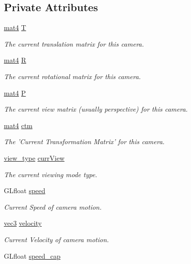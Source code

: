\subsection*{Private Attributes}
\begin{DoxyCompactItemize}
\item 
\hyperlink{class_angel_1_1mat4}{mat4} \hyperlink{class_camera_aa4cb92b539c9a9707a12d7025ed889f6}{T}
\begin{DoxyCompactList}\small\item\em The current translation matrix for this camera. \end{DoxyCompactList}\item 
\hyperlink{class_angel_1_1mat4}{mat4} \hyperlink{class_camera_a8fd028120b18556c43ad86756e637fbc}{R}
\begin{DoxyCompactList}\small\item\em The current rotational matrix for this camera. \end{DoxyCompactList}\item 
\hyperlink{class_angel_1_1mat4}{mat4} \hyperlink{class_camera_a0bee6fbae6ec5960850a5fb858f3912a}{P}
\begin{DoxyCompactList}\small\item\em The current view matrix (usually perspective) for this camera. \end{DoxyCompactList}\item 
\hyperlink{class_angel_1_1mat4}{mat4} \hyperlink{class_camera_a9b1e81e3f5531390bb6a599dca0d2444}{ctm}
\begin{DoxyCompactList}\small\item\em The 'Current Transformation Matrix' for this camera. \end{DoxyCompactList}\item 
\hyperlink{class_camera_afdccec6d447490dcc80ab6b99f21d0e5}{view\-\_\-type} \hyperlink{class_camera_a1fe2ef68d26bb98f0aa736948304eb64}{curr\-View}
\begin{DoxyCompactList}\small\item\em The current viewing mode type. \end{DoxyCompactList}\item 
G\-Lfloat \hyperlink{class_camera_a308e92b5d3ef0eea5cac7745df6e28f4}{speed}
\begin{DoxyCompactList}\small\item\em Current Speed of camera motion. \end{DoxyCompactList}\item 
\hyperlink{struct_angel_1_1vec3}{vec3} \hyperlink{class_camera_a5b95c890f213db50f321380108b17ea1}{velocity}
\begin{DoxyCompactList}\small\item\em Current Velocity of camera motion. \end{DoxyCompactList}\item 
\hypertarget{class_camera_aa075ae6872228fc4db892533d9f6d881}{G\-Lfloat \hyperlink{class_camera_aa075ae6872228fc4db892533d9f6d881}{speed\-\_\-cap}}\label{class_camera_aa075ae6872228fc4db892533d9f6d881}


\end{DoxyCompactItemize}
